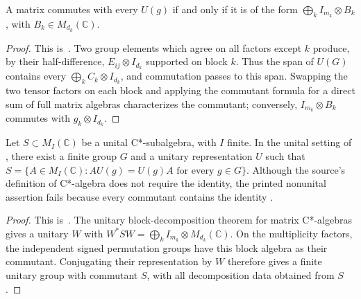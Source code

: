 \begin{lemma}%
    \label{thm:peps_block_signed_permutation_commutant}
    \leanok
    A matrix commutes with every $U(g)$ if and only if it is of the form
    $\bigoplus_k I_{m_k}\otimes B_k$, with $B_k\in M_{d_k}(\mathbb C)$.
\end{lemma}

\begin{proof}\leanok
    This is~\cite[``Commutant of independent multiplicity
        actions'']{QICLean2026Blueprint}.
    Two group elements which agree on all factors except $k$ produce,
    by their half-difference, $E_{ij}\otimes I_{d_k}$ supported on block $k$.
    Thus the span of $U(G)$ contains every
    $\bigoplus_k C_k\otimes I_{d_k}$, and commutation passes to this span.
    Swapping the two tensor factors on each block and applying the commutant
    formula for a direct sum of full matrix algebras characterizes the commutant;
    conversely, $I_{m_k}\otimes B_k$ commutes with $g_k\otimes I_{d_k}$.
\end{proof}

\begin{lemma}%
    \label{thm:peps_finite_group_commutant_unital}
    \leanok
    Let $S\subset M_I(\mathbb C)$ be a unital C*-subalgebra, with $I$ finite.
    In the unital setting of \cite[Theorem~4.1]{Schuch2010PEPS},
    there exist a finite group $G$ and a unitary representation $U$ such that
    $S=\{A\in M_I(\mathbb C): AU(g)=U(g)A\text{ for every }g\in G\}$.
    Although the source's definition of C*-algebra does not require the identity,
    the printed nonunital assertion fails because every commutant contains
    the identity \cite{gap:scp10_finite_group_commutant_unital}.
\end{lemma}

\begin{proof}\leanok
    This is~\cite[``Unital matrix algebras as finite-group
        commutants'']{QICLean2026Blueprint}.
    The unitary block-decomposition theorem for matrix C*-algebras
    \cite[Theorem~6.14]{Wolf2012Quantum} gives a unitary $W$ with
    $W^*SW=\bigoplus_k I_{m_k}\otimes M_{d_k}(\mathbb C)$.
    On the multiplicity factors, the independent signed permutation groups
    have this block algebra as their commutant. Conjugating their
    representation by $W$ therefore gives a finite unitary group with
    commutant $S$, with all decomposition data obtained from $S$.
\end{proof}


